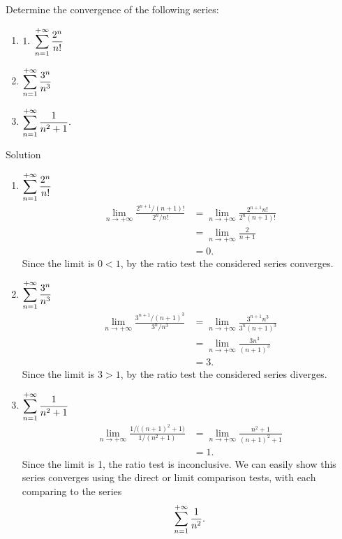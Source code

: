 \fi


\begin{example}\label{ex_ratio1}
Determine the convergence of the following series:
\begin{multicols}{3}
\begin{enumerate}
    \item $\displaystyle 1.\ \sum_{n=1}^{+\infty} \frac{2^n}{n!}$
    \item $\displaystyle\sum_{n=1}^{+\infty} \frac{3^n}{n^3} $
    \item $\displaystyle\sum_{n=1}^{+\infty} \frac{1}{n^2+1}.$
    \end{enumerate}
\end{multicols}


Solution 

\begin{enumerate}
	\item $\displaystyle \sum_{n=1}^{+\infty} \frac{2^n}{n!}$
	\begin{align*}
	\lim_{n\to+\infty}\frac{2^{n+1}/(n+1)!}{2^n/n!} &= \lim_{n\to+\infty} \frac{2^{n+1}n!}{2^n(n+1)!}\\
				&= \lim_{n\to+\infty} \frac{2}{n+1}\\
				&=0.
	\end{align*}
	Since the limit is $0<1$, by the ratio test the considered series converges.
	
	\item	$\displaystyle\sum_{n=1}^{+\infty} \frac{3^n}{n^3}$
	\begin{align*}
	\lim_{n\to+\infty} \frac{3^{n+1}/(n+1)^3}{3^n/n^3} &= \lim_{n\to+\infty}\frac{3^{n+1}n^3}{3^n(n+1)^3}\\
				&= \lim_{n\to+\infty} \frac{3n^3}{(n+1)^3}\\
				&= 3.
	\end{align*}
	Since the limit is $3>1$, by the ratio test the considered series diverges.
	
	\item  $\displaystyle\sum_{n=1}^{+\infty} \frac{1}{n^2+1}$
	\begin{align*}
	\lim_{n\to+\infty} \frac{1/\big((n+1)^2+1\big)}{1/(n^2+1)} &= \lim_{n\to+\infty} \frac{n^2+1}{(n+1)^2+1}\\
				&= 1.
	\end{align*}
	Since the limit is 1, the ratio test is inconclusive. We can easily show this series converges using the direct or limit comparison tests, with each comparing to the series $$\displaystyle \sum_{n=1}^{+\infty} \frac{1}{n^2}.$$
\end{enumerate}
\end{example}

